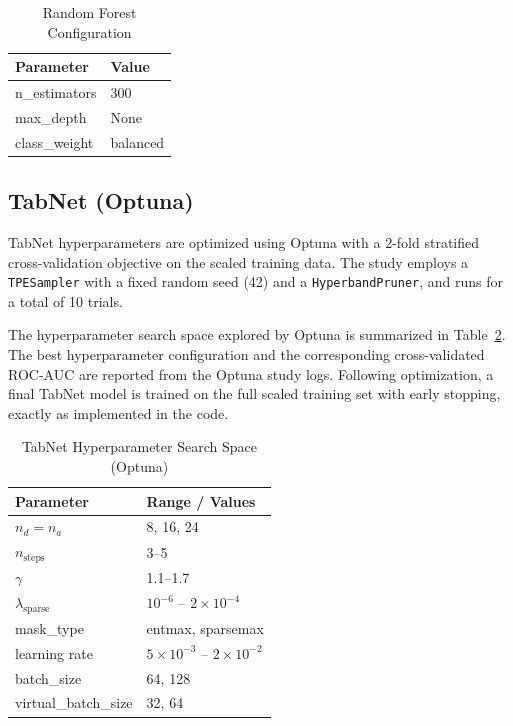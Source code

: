 \documentclass[10pt,conference]{IEEEtran}
\begin{document}
\begin{table}[t]
\centering
\caption{Random Forest Configuration}
\label{tab:rf_params}
\begin{tabular}{@{}ll@{}}
\toprule
Parameter & Value \\
\midrule
n\_estimators & 300 \\
max\_depth & None \\
class\_weight & balanced \\
\bottomrule
\end{tabular}
\end{table}


\subsection{TabNet (Optuna)}
TabNet hyperparameters are optimized using Optuna with a 2-fold stratified
cross-validation objective on the scaled training data. The study employs a
\texttt{TPESampler} with a fixed random seed (42) and a
\texttt{HyperbandPruner}, and runs for a total of 10 trials.

The hyperparameter search space explored by Optuna is summarized in
Table~\ref{tab:tabnet_optuna}. The best hyperparameter configuration and the
corresponding cross-validated ROC-AUC are reported from the Optuna study logs. Following optimization, a final TabNet model is trained on the full scaled training set
with early stopping, exactly as implemented in the code.

\begin{table}[t]
\centering
\caption{TabNet Hyperparameter Search Space (Optuna)}
\label{tab:tabnet_optuna}
\begin{tabular}{@{}ll@{}}
\toprule
Parameter & Range / Values \\
\midrule
$n_d = n_a$ & 8, 16, 24 \\
$n_{\text{steps}}$ & 3--5 \\
$\gamma$ & 1.1--1.7 \\
$\lambda_{\text{sparse}}$ & $10^{-6}$ -- $2\times10^{-4}$ \\
mask\_type & entmax, sparsemax \\
learning rate & $5\times10^{-3}$ -- $2\times10^{-2}$ \\
batch\_size & 64, 128 \\
virtual\_batch\_size & 32, 64 \\
\bottomrule
\end{tabular}
\end{table}
\end{document}
